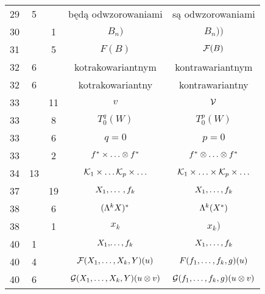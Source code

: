 \documentclass[a4paper,11pt]{article}
\begin{document}
\begin{center}
\begin{tabular}{|c|c|c|c|c|}
    29  &  5 & & będą odwzorowaniami & są odwzorowaniami \\
    30  & &  1 & $B_{ n } )$ & $B_{ n } ) )$ \\
    31  & &  5 & $F( B )$ & $\mathcal{F}( B )$ \\
    32  &  6 & & kotrakowariantnym & kontrawariantnym \\
    32  &  6 & & kotrakowariantny & kontrawariantny \\
    33  & & 11 & $v$ & $\mathcal{V}$ \\
    33  & &  8 & $T_{ 0 }^{ q }( W )$ & $T_{ 0 }^{ p }( W )$ \\
    33  & &  6 & $q = 0$ & $p = 0$ \\
    33  & &  2 & $f^{ * } \times \ldots \otimes f^{ * }$
           & $f^{ * } \otimes \ldots \otimes f^{ * }$ \\
    34  & 13 & & $\mathcal{K}_{ 1 } \times \ldots \mathcal{K}_{ p } \times \ldots$
           & $\mathcal{K}_{ 1 } \times \ldots \times \mathcal{K}_{ p } \times \ldots$ \\
    37  & & 19 & $X_{ 1 }, \ldots\, , f_{ k }$ & $X_{ 1 }, \ldots , f_{ k }$ \\
    38  & &  6 & $( \Lambda^{ k } X )^{ * }$ & $\Lambda^{ k }( X^{ * } )$ \\
    38  & &  1 & $x_{ k }$ & $x_{ k } )$ \\
    40  &  1 & & $X_{ 1 }, \! \ldots , f_{ k }$ & $X_{ 1 }, \ldots , f_{ k }$ \\
    40  &  4 & & $\mathcal{F}( X_{ 1 }, \ldots, X_{ k }, Y )( u )$
           & $F( f_{ 1 }, \ldots, f_{ k }, g )( u )$ \\
    40  &  6 & & $\mathcal{G}( X_{ 1 }, \ldots, X_{ k }, Y )( u \otimes v )$
           & $\mathcal{G}( f_{ 1 }, \ldots, f_{ k }, g )( u \otimes v )$ \\
    \hline
  \end{tabular}


\end{center}
\end{document}
